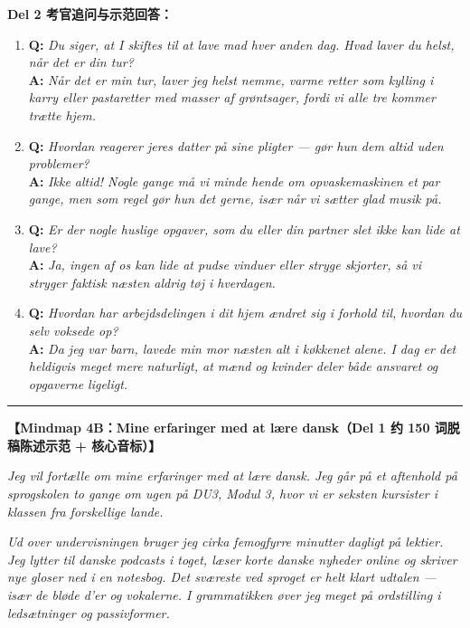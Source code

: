 \begin{answerbox}
\vspace{0.25em}
\textbf{\color{NCDRed}Del 2 考官追问与示范回答：}
\begin{enumerate}
  \item \textbf{Q:} \textit{Du siger, at I skiftes til at lave mad hver anden dag. Hvad laver du helst, når det er din tur?}\\
  \textbf{A:} \textit{Når det er min tur, laver jeg helst nemme, varme retter som kylling i karry eller pastaretter med masser af grøntsager, fordi vi alle tre kommer trætte hjem.}
  \item \textbf{Q:} \textit{Hvordan reagerer jeres datter på sine pligter --- gør hun dem altid uden problemer?}\\
  \textbf{A:} \textit{Ikke altid! Nogle gange må vi minde hende om opvaskemaskinen et par gange, men som regel gør hun det gerne, især når vi sætter glad musik på.}
  \item \textbf{Q:} \textit{Er der nogle huslige opgaver, som du eller din partner slet ikke kan lide at lave?}\\
  \textbf{A:} \textit{Ja, ingen af os kan lide at pudse vinduer eller stryge skjorter, så vi stryger faktisk næsten aldrig tøj i hverdagen.}
  \item \textbf{Q:} \textit{Hvordan har arbejdsdelingen i dit hjem ændret sig i forhold til, hvordan du selv voksede op?}\\
  \textbf{A:} \textit{Da jeg var barn, lavede min mor næsten alt i køkkenet alene. I dag er det heldigvis meget mere naturligt, at mænd og kvinder deler både ansvaret og opgaverne ligeligt.}
\end{enumerate}

\vspace{0.4em}
\hrule
\vspace{0.4em}

\textbf{\color{NCDNavy}【Mindmap 4B：Mine erfaringer med at lære dansk（Del 1 约 150 词脱稿陈述示范 + 核心音标）】}

\vspace{0.18em}
\textit{Jeg vil fortælle om mine erfaringer  med at lære dansk. Jeg går på et aftenhold på sprogskolen to gange om ugen på DU3, Modul 3, hvor vi er seksten kursister i klassen fra forskellige lande.}

\vspace{0.18em}
\textit{Ud over undervisningen bruger jeg cirka femogfyrre minutter dagligt på lektier. Jeg lytter til danske podcasts i toget, læser korte danske nyheder online og skriver nye gloser ned i en notesbog. Det sværeste ved sproget er helt klart udtalen  --- især de bløde d'er og vokalerne. I grammatikken øver jeg meget på ordstilling  i ledsætninger og passivformer.}


\end{answerbox}
